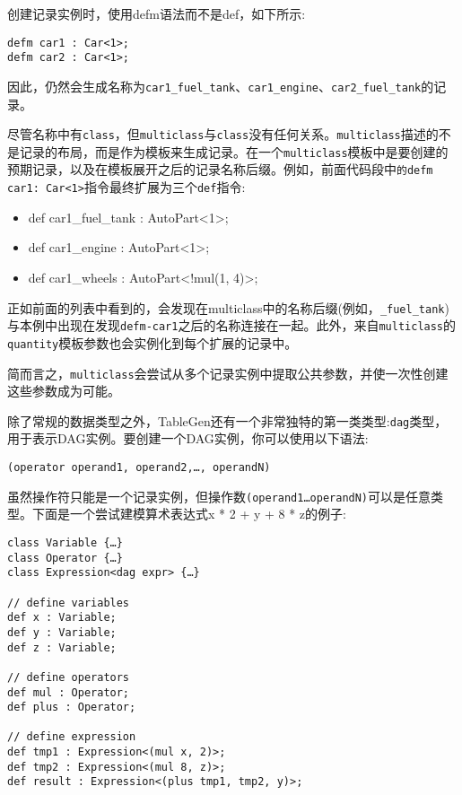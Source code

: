 创建记录实例时，使用defm语法而不是def，如下所示:

\begin{lstlisting}[style=styleCXX]
defm car1 : Car<1>;
defm car2 : Car<1>;
\end{lstlisting}

因此，仍然会生成名称为\texttt{car1\_fuel\_tank}、\texttt{car1\_engine}、\texttt{car2\_fuel\_tank}的记录。

尽管名称中有\texttt{class}，但\texttt{multiclass}与\texttt{class}没有任何关系。\texttt{multiclass}描述的不是记录的布局，而是作为模板来生成记录。在一个\texttt{multiclass}模板中是要创建的预期记录，以及在模板展开之后的记录名称后缀。例如，前面代码段中\texttt{的defm car1: Car<1>}指令最终扩展为三个\texttt{def}指令:

\begin{itemize}
\ttfamily
\item def car1\_fuel\_tank : AutoPart<1>;
\item def car1\_engine : AutoPart<1>;
\item def car1\_wheels : AutoPart<!mul(1, 4)>;
\end{itemize}

正如前面的列表中看到的，会发现在multiclass中的名称后缀(例如，\texttt{\_fuel\_tank})与本例中出现在发现\texttt{defm-car1}之后的名称连接在一起。此外，来自\texttt{multiclass}的\texttt{quantity}模板参数也会实例化到每个扩展的记录中。

简而言之，\texttt{multiclass}会尝试从多个记录实例中提取公共参数，并使一次性创建这些参数成为可能。


除了常规的数据类型之外，TableGen还有一个非常独特的第一类类型:\texttt{dag}类型，用于表示DAG实例。要创建一个DAG实例，你可以使用以下语法:

\begin{lstlisting}[style=styleCXX]
(operator operand1, operand2,…, operandN)
\end{lstlisting}

虽然操作符只能是一个记录实例，但操作数\texttt{(operand1…operandN)}可以是任意类型。下面是一个尝试建模算术表达式x * 2 + y + 8 * z的例子:

\begin{lstlisting}[style=styleCXX]
class Variable {…}
class Operator {…}
class Expression<dag expr> {…}

// define variables
def x : Variable;
def y : Variable;
def z : Variable;

// define operators
def mul : Operator;
def plus : Operator;

// define expression
def tmp1 : Expression<(mul x, 2)>;
def tmp2 : Expression<(mul 8, z)>;
def result : Expression<(plus tmp1, tmp2, y)>;
\end{lstlisting}

